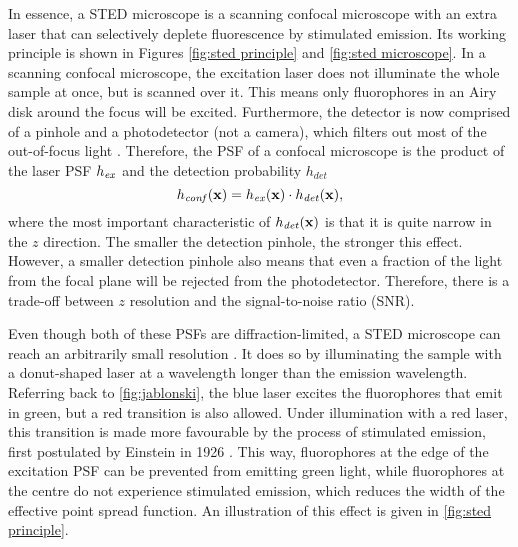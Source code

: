 In essence, a STED microscope is a scanning confocal microscope with an extra laser that can selectively deplete fluorescence by stimulated emission. Its working principle is shown in Figures \ref{fig:sted principle} and \ref{fig:sted microscope}. In a scanning confocal microscope, the excitation laser does not illuminate the whole sample at once, but is scanned over it. This means only fluorophores in an Airy disk around the focus will be excited. Furthermore, the detector is now comprised of a pinhole and a photodetector (not a camera), which filters out most of the out-of-focus light \cite{Minsky1957}. Therefore, the PSF of a confocal microscope is the product of the laser PSF $ h_{\mathit{ex}} $ and the detection probability $ h_\mathit{det} $
\begin{equation}
	h_\mathit{conf}(\vb{x}) = h_{\mathit{ex}}(\vb{x}) \cdot h_\mathit{det}(\vb{x}),
\end{equation}
where the most important characteristic of $ h_\mathit{det}(\vb{x}) $ is that it is quite narrow in the $ z $ direction. The smaller the detection pinhole, the stronger this effect. However, a smaller detection pinhole also means that even a fraction of the light from the focal plane will be rejected from the photodetector. Therefore, there is a trade-off between $ z $ resolution and the signal-to-noise ratio (SNR).

Even though both of these PSFs are diffraction-limited, a STED microscope can reach an arbitrarily small resolution \cite{Wildanger2012}. It does so by illuminating the sample with a donut-shaped laser at a wavelength longer than the emission wavelength. Referring back to \autoref{fig:jablonski}, the blue laser excites the fluorophores that emit in green, but a red transition is also allowed. Under illumination with a red laser, this transition is made more favourable by the process of stimulated emission, first postulated by Einstein in 1926 \cite{Einstein1926}. This way, fluorophores at the edge of the excitation PSF can be prevented from emitting green light, while fluorophores at the centre do not experience stimulated emission, which reduces the width of the effective point spread function. An illustration of this effect is given in \autoref{fig:sted principle}.


